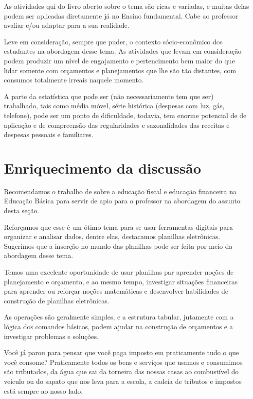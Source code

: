\begin{paginatexto}
As atividades qui do livro aberto sobre o tema são ricas e variadas, e muitas delas podem ser aplicadas diretamente já no Ensino fundamental. Cabe ao professor avaliar e/ou adaptar para a sua realidade. 

Leve em consideração, sempre que puder, o contexto sócio-econômico dos estudantes na abordagem desse tema. As atividades que levam em consideração podem produzir um nível de engajamento e pertencimento bem maior do que lidar somente com orçamentos e planejamentos que lhe são tão distantes, com consumos totalmente irreais naquele momento. 

A parte da estatística que pode ser (não necessariamente tem que ser) trabalhado, tais como média móvel, série histórica (despesas com luz, gás, telefone), pode ser um ponto de dificuldade, todavia, tem enorme potencial de de aplicação e de compreensão das regularidades e sazonalidades das receitas e despesas pessoais e familiares.

\section*{Enriquecimento da discussão}

Recomendamos o trabalho de \cite{dias2018} sobre a educação fiscal e educação financeira na Educação Básica para servir de apio para o professor na abordagem do assunto desta seção.

Reforçamos que esse é um ótimo tema para se usar ferramentas digitais para organizar e analisar dados, dentre elas, destacamos planilhas eletrônicas. Sugerimos que a inserção no mundo das planilhas pode ser feita por meio da abordagem desse tema.

Temos uma excelente oportunidade de usar planilhas par aprender noções de planejamento e orçamento, e ao mesmo tempo, investigar situações financeiras para aprender ou reforçar noções matemáticas e desenvolver habilidades de construção de planilhas eletrônicas.

As operações são geralmente simples, e a estrutura tabular, jutamente com a lógica dos comandos básicos, podem ajudar na construção de orçamentos e a investigar problemas e soluções.
\end{paginatexto}
\label{fin-exp-8}

Você já parou para pensar que você paga imposto em praticamente tudo o que você consome? Praticamente todos os bens e serviços que usamos e consumimos são tributados, da água que sai da torneira das nossas casas ao combustível do veículo ou do sapato que nos leva para a escola, a cadeia de tributos e impostos está sempre ao nosso lado.

